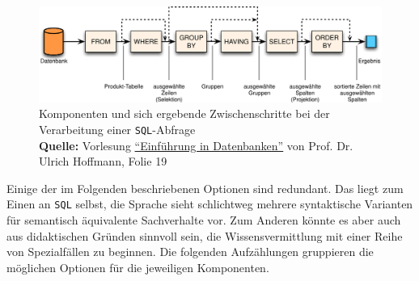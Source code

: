 \begin{figure}
  \centering \includegraphics{images/sql-steps.png}
  \caption{%
    Komponenten und sich ergebende Zwischenschritte bei der Verarbeitung einer \texttt{SQL}-Abfrage%
    \\\hspace{\linewidth}%
    \textbf{Quelle:} Vorlesung \href{http://www.fh-wedel.de/fileadmin/mitarbeiter/uh/WS201516/Datenbanken_04.pdf}{"`Einführung in Datenbanken"'} von Prof. Dr. Ulrich Hoffmann, Folie 19}
  \label{fig:sql-steps}
\end{figure}

Einige der im Folgenden beschriebenen Optionen sind redundant. Das liegt zum Einen an \texttt{SQL} selbst, die Sprache sieht schlichtweg mehrere syntaktische Varianten für semantisch äquivalente Sachverhalte vor. Zum Anderen könnte es aber auch aus didaktischen Gründen sinnvoll sein, die Wissensvermittlung mit einer Reihe von Spezialfällen zu beginnen. Die folgenden Aufzählungen gruppieren die möglichen Optionen für die jeweiligen Komponenten.

